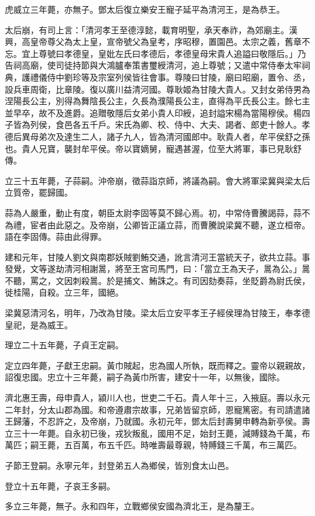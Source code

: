 \begin{pinyinscope}
虎威立三年薨，亦無子。鄧太后復立樂安王寵子延平為清河王，是為恭王。

太后崩，有司上言：「清河孝王至德淳懿，載育明聖，承天奉祚，為郊廟主。漢興，高皇帝尊父為太上皇，宣帝號父為皇考，序昭穆，置園邑。太宗之義，舊章不忘。宜上尊號曰孝德皇，皇妣左氏曰孝德后，孝德皇母宋貴人追謚曰敬隱后。」乃告祠高廟，使司徒持節與大鴻臚奉策書璽綬清河，追上尊號；又遣中常侍奉太牢祠典，護禮儀侍中劉珍等及宗室列侯皆往會事。尊陵曰甘陵，廟曰昭廟，置令、丞，設兵車周衛，比章陵。復以廣川益清河國。尊耿姬為甘陵大貴人。又封女弟侍男為涅陽長公主，別得為舞陰長公主，久長為濮陽長公主，直得為平氏長公主。餘七主並早卒，故不及進爵。追贈敬隱后女弟小貴人印綬，追封謚宋楊為當陽穆侯。楊四子皆為列侯，食邑各五千戶。宋氏為卿、校、侍中、大夫、謁者、郎吏十餘人。孝德后異母弟次及達生二人，諸子九人，皆為清河國郎中。耿貴人者，牟平侯舒之孫也。貴人兄寶，襲封牟平侯。帝以寶嫡舅，寵遇甚渥，位至大將軍，事已見耿舒傳。

立三十五年薨，子蒜嗣。沖帝崩，徵蒜詣京師，將議為嗣。會大將軍梁冀與梁太后立質帝，罷歸國。

蒜為人嚴重，動止有度，朝臣太尉李固等莫不歸心焉。初，中常侍曹騰謁蒜，蒜不為禮，宦者由此惡之。及帝崩，公卿皆正議立蒜，而曹騰說梁冀不聽，遂立桓帝。語在李固傳。蒜由此得罪。

建和元年，甘陵人劉文與南郡妖賊劉鮪交通，訛言清河王當統天子，欲共立蒜。事發覺，文等遂劫清河相謝暠，將至王宮司馬門，曰：「當立王為天子，暠為公。」暠不聽，罵之，文因刺殺暠。於是捕文、鮪誅之。有司因劾奏蒜，坐貶爵為尉氏侯，徙桂陽，自殺。立三年，國絕。

梁冀惡清河名，明年，乃改為甘陵。梁太后立安平孝王子經侯理為甘陵王，奉孝德皇祀，是為威王。

理立二十五年薨，子貞王定嗣。

定立四年薨，子獻王忠嗣。黃巾賊起，忠為國人所執，既而釋之。靈帝以親親故，詔復忠國。忠立十三年薨，嗣子為黃巾所害，建安十一年，以無後，國除。

濟北惠王壽，母申貴人，潁川人也，世吏二千石。貴人年十三，入掖庭。壽以永元二年封，分太山郡為國。和帝遵肅宗故事，兄弟皆留京師，恩寵篤密。有司請遣諸王歸藩，不忍許之，及帝崩，乃就國。永初元年，鄧太后封壽舅申轉為新亭侯。壽立三十一年薨。自永初已後，戎狄叛亂，國用不足，始封王薨，減賻錢為千萬，布萬匹；嗣王薨，五百萬，布五千匹。時唯壽最尊親，特賻錢三千萬，布三萬匹。

子節王登嗣。永寧元年，封登弟五人為鄉侯，皆別食太山邑。

登立十五年薨，子哀王多嗣。

多立三年薨，無子。永和四年，立戰鄉侯安國為濟北王，是為釐王。


\end{pinyinscope}
